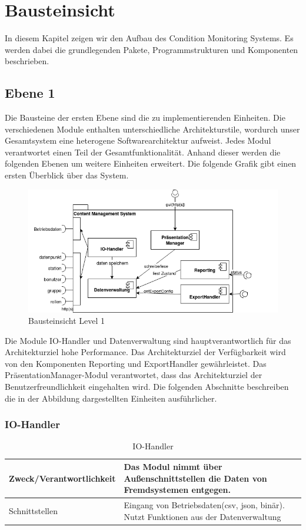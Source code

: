 \chapter{Bausteinsicht}
In diesem Kapitel zeigen wir den Aufbau des Condition Monitoring Systems. Es werden dabei die grundlegenden Pakete, Programmstrukturen und Komponenten beschrieben.
\section{Ebene 1}
Die Bausteine der ersten Ebene sind die zu implementierenden Einheiten. Die verschiedenen Module enthalten unterschiedliche Architekturstile, wordurch unser Gesamtsystem eine heterogene Softwarearchitektur aufweist. Jedes Modul verantwortet einen Teil der Gesamtfunktionalität. Anhand dieser werden die folgenden Ebenen um weitere Einheiten erweitert. Die folgende Grafik gibt einen ersten Überblick über das System.
\begin{figure}[h]
	\centering
	\includegraphics[width=1.0\textwidth]{Graphics/bausteinansicht_ebene_1.png}
	\caption{Bausteinsicht Level 1}
	\label{fig:bausteinsichtlvl1}
\end{figure}
Die Module IO-Handler und Datenverwaltung sind hauptverantwortlich für das Architekturziel hohe Performance.
Das Architekturziel der Verfügbarkeit wird von den Komponenten Reporting und ExportHandler gewährleistet. 
Das PräsentationManager-Modul verantwortet, dass das Architekturziel der Benutzerfreundlichkeit eingehalten wird.
Die folgenden Abschnitte beschreiben die in der Abbildung dargestellten Einheiten ausführlicher.
\clearpage
\subsection{IO-Handler}
\begin{table}[th]
	\begin{tabularx}{\textwidth}{p{5cm} X}
		\hline
		 Zweck/Verantwortlichkeit & Das Modul nimmt über Außenschnittstellen die Daten von Fremdsystemen entgegen. \\
		 \hline
		 Schnittstellen &  Eingang von Betriebsdaten(csv, json, binär). Nutzt Funktionen aus der Datenverwaltung \\
		 \hline
	\end{tabularx} 
	\caption{IO-Handler}
	\label{tab:IO-Handler}
\end{table}

